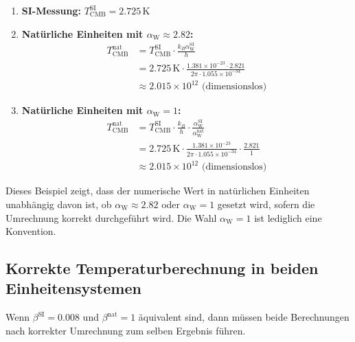 \documentclass[12pt,a4paper]{article}
\newcommand{\alphaW}{\alpha_{\text{W}}}
\begin{document}
\begin{enumerate}
	\item \textbf{SI-Messung:} \(T_{\text{CMB}}^{\text{SI}} = 2.725 \, \text{K}\)
	
	\item \textbf{Natürliche Einheiten mit \(\alphaW \approx 2.82\):}
	\begin{align}
		T_{\text{CMB}}^{\text{nat}} &= T_{\text{CMB}}^{\text{SI}} \cdot \frac{k_B \alphaW^{\text{SI}}}{h} \\
		&= 2.725 \, \text{K} \cdot \frac{1.381 \times 10^{-23} \cdot 2.821}{2\pi \cdot 1.055 \times 10^{-34}} \\
		&\approx 2.015 \times 10^{12} \text{ (dimensionslos)}
	\end{align}
	
	\item \textbf{Natürliche Einheiten mit \(\alphaW = 1\):}
	\begin{align}
		T_{\text{CMB}}^{\text{nat}} &= T_{\text{CMB}}^{\text{SI}} \cdot \frac{k_B}{h} \cdot \frac{\alphaW^{\text{SI}}}{\alphaW^{\text{nat}}} \\
		&= 2.725 \, \text{K} \cdot \frac{1.381 \times 10^{-23}}{2\pi \cdot 1.055 \times 10^{-34}} \cdot \frac{2.821}{1} \\
		&\approx 2.015 \times 10^{12} \text{ (dimensionslos)}
	\end{align}
\end{enumerate}

Dieses Beispiel zeigt, dass der numerische Wert in natürlichen Einheiten unabhängig davon ist, ob \(\alphaW \approx 2.82\) oder \(\alphaW = 1\) gesetzt wird, sofern die Umrechnung korrekt durchgeführt wird. Die Wahl \(\alphaW = 1\) ist lediglich eine Konvention.

\subsection{Korrekte Temperaturberechnung in beiden Einheitensystemen}

Wenn \(\beta^{\text{SI}} = 0.008\) und \(\beta^{\text{nat}} = 1\) äquivalent sind, dann müssen beide Berechnungen nach korrekter Umrechnung zum selben Ergebnis führen.
\end{document}
